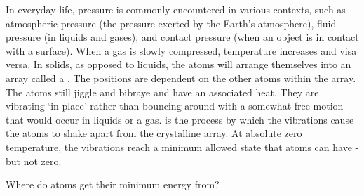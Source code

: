 In everyday life, pressure is commonly encountered in various contexts, such as atmospheric pressure (the pressure exerted by the Earth's atmosphere), fluid pressure (in liquids and gases), and contact pressure (when an object is in contact with a surface). When a gas is slowly compressed, temperature increases and visa versa. In solids, as opposed to liquids, the atoms will arrange themselves into an array called a . The positions are dependent on the other atoms within the array. The atoms still jiggle and bibraye and have an associated heat. They are vibrating `in place' rather than bouncing around with a somewhat free motion that would occur in liquids or a gas.  is the process by which the vibrations cause the atoms to shake apart from the crystalline array. At absolute zero temperature, the vibrations reach a minimum allowed state that atoms can have - but not zero. 

\begin{questions}
	\item Where do atoms get their minimum energy from?
\end{questions}